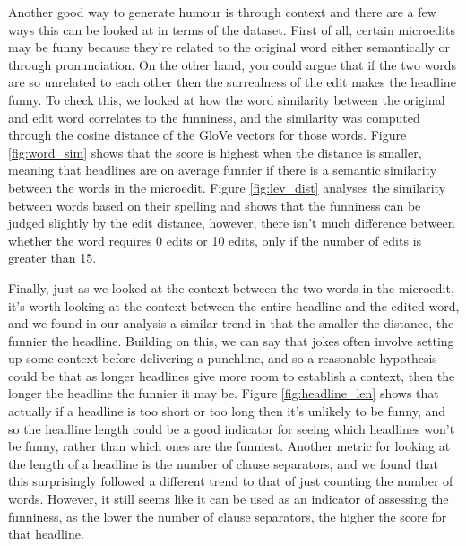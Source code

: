 \documentclass[11pt,a4paper]{article}
\begin{document}
Another good way to generate humour is through context and there are a few ways this can be looked at in terms of the dataset. First of all, certain microedits may be funny because they’re related to the original word either semantically or through pronunciation. On the other hand, you could argue that if the two words are so unrelated to each other then the surrealness of the edit makes the headline funny. To check this, we looked at how the word similarity between the original and edit word correlates to the funniness, and the similarity was computed through the cosine distance of the GloVe vectors for those words. Figure \ref{fig:word_sim} shows that the score is highest when the distance is smaller, meaning that headlines are on average funnier if there is a semantic similarity between the words in the microedit. Figure \ref{fig:lev_dist} analyses the similarity between words based on their spelling and shows that the funniness can be judged slightly by the edit distance, however, there isn't much difference between whether the word requires 0 edits or 10 edits, only if the number of edits is greater than 15. 

Finally, just as we looked at the context between the two words in the microedit, it’s worth looking at the context between the entire headline and the edited word, and we found in our analysis a similar trend in that the smaller the distance, the funnier the headline. Building on this, we can say that jokes often involve setting up some context before delivering a punchline, and so a reasonable hypothesis could be that as longer headlines give more room to establish a context, then the longer the headline the funnier it may be. Figure \ref{fig:headline_len} shows that actually if a headline is too short or too long then it’s unlikely to be funny, and so the headline length could be a good indicator for seeing which headlines won’t be funny, rather than which ones are the funniest. Another metric for looking at the length of a headline is the number of clause separators, and we found that this surprisingly followed a different trend to that of just counting the number of words. However, it still seems like it can be used as an indicator of assessing the funniness, as the lower the number of clause separators, the higher the score for that headline.
\end{document}
